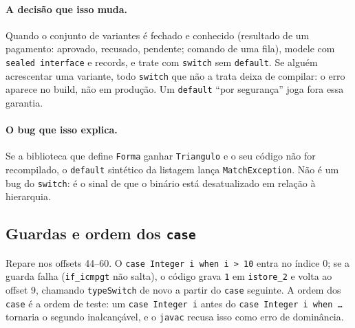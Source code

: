 \paragraph{A decisão que isso muda.}
Quando o conjunto de variantes é fechado e conhecido (resultado de um
pagamento: aprovado, recusado, pendente; comando de uma fila), modele com
\texttt{sealed interface} e records, e trate com \texttt{switch} sem
\texttt{default}. Se alguém acrescentar uma variante, todo
\texttt{switch} que não a trata deixa de compilar: o erro aparece no
build, não em produção. Um \texttt{default} \enquote{por segurança} joga
fora essa garantia.

\paragraph{O bug que isso explica.}
Se a biblioteca que define \texttt{Forma} ganhar \texttt{Triangulo} e o
seu código não for recompilado, o \texttt{default} sintético da listagem
lança \texttt{MatchException}. Não é um bug do \texttt{switch}: é o
sinal de que o binário está desatualizado em relação à hierarquia.

\subsection*{Guardas e ordem dos \texttt{case}}



Repare nos offsets 44--60. O \texttt{case Integer i when i > 10} entra
no índice 0; se a guarda falha (\texttt{if\_icmpgt} não salta), o código
grava \texttt{1} em \texttt{istore\_2} e volta ao offset 9, chamando
\texttt{typeSwitch} de novo a partir do \texttt{case} seguinte. A ordem
dos \texttt{case} é a ordem de teste: um \texttt{case Integer i} antes
do \texttt{case Integer i when \ldots} tornaria o segundo inalcançável,
e o \texttt{javac} recusa isso como erro de dominância.

